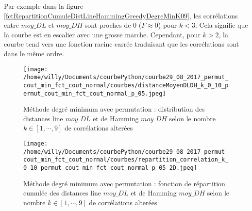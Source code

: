 \documentclass[onecolumn, 12pt]{book}
\begin{document}
Par exemple dans la figure \ref{fctRepartitionCumuleDistLineHammingGreedyDegreMinK09}, les corr\'elations entre $moy\_DL$ et $moy\_DH$ sont proches de $0$ ($F \approx 0$) pour $k < 3$. Cela signifie que la courbe est  en escalier avec une grosse marche.
Cependant, pour $k>2$, la courbe tend vers une fonction racine carr\'ee traduisant que les corr\'elations sont dans le m\^eme ordre. 
\newline
\begin{centering} 
\begin{figure}[htb!] 
\texttt{[image: /home/willy/Documents/courbePython/courbe29\_08\_2017\_permut\_cout\_min\_fct\_cout\_normal/courbes/distanceMoyenDLDH\_k\_0\_10\_permut\_cout\_min\_fct\_cout\_normal\_p\_05.jpeg]}
\caption{ M\'ethode degr\'e minimum avec permutation : distribution des distances line $moy\_DL$ et de Hamming $moy\_DH$ selon le nombre $k \in [1, \cdots, 9]$ de corr\'elations alter\'ees}
\label{distLineHammingPermutCoutMinK09} 
\end{figure}
\end{centering} 
\begin{centering} 
\begin{figure}[htb!]
\texttt{[image: /home/willy/Documents/courbePython/courbe29\_08\_2017\_permut\_cout\_min\_fct\_cout\_normal/courbes/repartition\_correlation\_k\_0\_10\_permut\_cout\_min\_fct\_cout\_normal\_p\_05\_2D.jpeg]}
\caption{ M\'ethode degr\'e minimum avec permutation : fonction de r\'epartition cumul\'ee des distances line $moy\_DL$ et de Hamming $moy\_DH$ selon le nombre $k \in [1, \cdots, 9]$ de corr\'elations alter\'ees}
\label{fctRepartitionCumuleDistLineHammingPermutCoutMinK09} 
\end{figure}
\end{centering} 
\end{document}
